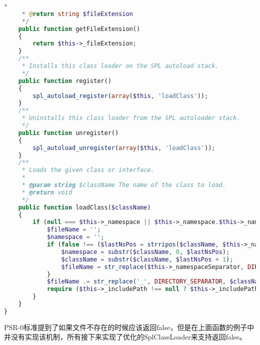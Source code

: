 \begin{lstlisting}[language=PHP]
     *
     * @return string $fileExtension
     */
    public function getFileExtension()
    {
        return $this->_fileExtension;
    }
    /**
     * Installs this class loader on the SPL autoload stack.
     */
    public function register()
    {
        spl_autoload_register(array($this, 'loadClass'));
    }
    /**
     * Uninstalls this class loader from the SPL autoloader stack.
     */
    public function unregister()
    {
        spl_autoload_unregister(array($this, 'loadClass'));
    }
    /**
     * Loads the given class or interface.
     *
     * @param string $className The name of the class to load.
     * @return void
     */
    public function loadClass($className)
    {
        if (null === $this->_namespace || $this->_namespace.$this->_namespaceSeparator === substr($className, 0, strlen($this->_namespace.$this->_namespaceSeparator))) {
            $fileName = '';
            $namespace = '';
            if (false !== ($lastNsPos = strripos($className, $this->_namespaceSeparator))) {
                $namespace = substr($className, 0, $lastNsPos);
                $className = substr($className, $lastNsPos + 1);
                $fileName = str_replace($this->_namespaceSeparator, DIRECTORY_SEPARATOR, $namespace) . DIRECTORY_SEPARATOR;
            }
            $fileName .= str_replace('_', DIRECTORY_SEPARATOR, $className) . $this->_fileExtension;
            require ($this->_includePath !== null ? $this->_includePath . DIRECTORY_SEPARATOR : '') . $fileName;
        }
    }
}
\end{lstlisting}

PSR-0标准提到了如果文件不存在的时候应该返回false，但是在上面函数的例子中并没有实现该机制，所有接下来实现了优化的SplClassLoader来支持返回false。

